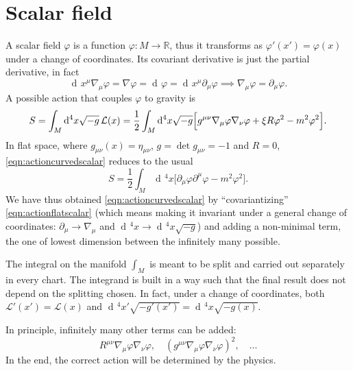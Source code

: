\documentclass[a4paper,12pt]{book}
\newcommand{\dd}{\mathop{\mathrm{d}\!}{}}
\theoremstyle{definition}
\theoremstyle{remark}
\begin{document}
\section{Scalar field}
A scalar field $\varphi$ is a function $\varphi\colon M\to\mathbb R$, thus it transforms as $\varphi'(x')=\varphi(x)$ under a change of coordinates. Its covariant derivative is just the partial derivative, in fact
\[\dd x^\mu\nabla_\mu\varphi=\nabla\varphi=\dd\varphi=\dd x^\mu\partial_\mu\varphi\implies\nabla_\mu\varphi=\partial_\mu\varphi.\]
A possible action that couples $\varphi$ to gravity is
\begin{equation}
S=\int_M\dd^4x\sqrt{-g}\,\mathcal L(x)=\frac{1}{2}\int_M\dd^4x\sqrt{-g}\Bigl[g^{\mu\nu}\nabla_\mu\varphi\nabla_\nu\varphi+\xi R\varphi^2-m^2\varphi^2\Bigr].
\label{eqn:actioncurvedscalar}
\end{equation}
In flat space, where $g_{\mu\nu}(x)=\eta_{\mu\nu}$, $g=\det g_{\mu\nu}=-1$ and $R=0$, \cref{eqn:actioncurvedscalar} reduces to the usual
\begin{equation}
S=\frac{1}{2}\int_M\dd^4x\Bigr[\partial_\mu\varphi\partial^\mu\varphi-m^2\varphi^2\Bigr].
\label{eqn:actionflatscalar}
\end{equation}
We have thus obtained \cref{eqn:actioncurvedscalar} by ``covariantizing'' \cref{eqn:actionflatscalar} (which means making it invariant under a general change of coordinates: $\partial_\mu\to\nabla_\mu$ and $\dd^4x\to\dd^4x\sqrt{-g}$) and adding a non-minimal term, the one of lowest dimension between the infinitely many possible.

The integral on the manifold $\int_M$ is meant to be split and carried out separately in every chart. The integrand is built in a way such that the final result does not depend on the splitting chosen. In fact, under a change of coordinates, both $\mathcal L'(x')=\mathcal L(x)$ and $\dd^4x'\sqrt{-g'(x')}=\dd^4x\sqrt{-g(x)}$.

In principle, infinitely many other terms can be added:
\[R^{\mu\nu}\nabla_\mu\varphi\nabla_\nu\varphi,\quad (g^{\mu\nu}\nabla_\mu\varphi\nabla_\nu\varphi)^2,\quad\ldots\]
In the end, the correct action will be determined by the physics.
\end{document}
